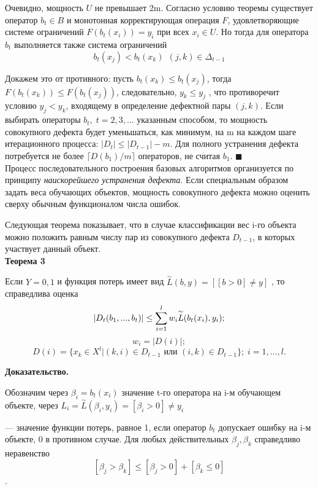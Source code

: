 Очевидно, мощность $U$ не превышает 2m. Согласно условию теоремы существует оператор $b_t \in B$ и монотонная корректирующая операция $F$, удовлетворяющие системе
ограничений $F(b_t(x_i)) = y_i$ при всех $x_i \in U$. Но тогда для оператора $b_t$ выполняется
также система ограничений
\[ b_t(x_j) < b_t(x_k) \; \, (j, k) \in \Delta_{t-1}\]


Докажем это от противного: пусть $b_t(x_k) \leq b_t(x_j )$, тогда $F(b_t(x_k)) \leq F(b_t(x_j ))$, следовательно, $y_k \leq y_j$
, что противоречит условию $y_j < y_k$, входящему в определение
дефектной пары $(j, k)$.
Если выбирать операторы $b_t , \; t = 2, 3, . . .$ указанным способом, то мощность
совокупного дефекта будет уменьшаться, как минимум, на m на каждом шаге итерационного процесса: $\vert D_t \vert \leq \vert D_{t-1}\vert -m$. Для полного устранения дефекта потребуется не более $\lceil D(b_1)/m\rceil$
операторов, не считая $b_1$. $\blacksquare$
\\

Процесс последовательного построения базовых алгоритмов организуется
по принципу \textit{наискорейшего устранения дефекта}.
Если специальным образом задать веса
обучающих объектов, мощность совокупного дефекта можно оценить сверху
обычным функционалом числа ошибок.

Следующая теорема показывает, что в случае классификации вес i-го объекта
можно положить равным числу пар из совокупного дефекта $D_{t-1}$, в которых участвует данный объект.\\

\textbf{Теорема 3} 

Если $Y = {0, 1}$ и функция потерь имеет вид $\overset{\sim}{L}(b, y) =[[b > 0]\neq y]$ , то справедлива оценка \[\vert D_t(b_1, . . . , b_t)\vert \leq \operatornamewithlimits{\sum}^l_{i=1} w_i \overset{\sim}{L} (b_t(x_i), y_i); \]
\[w_i = \vert D(i)\vert ;\]
\[D(i) = \lbrace x_k \in X^l \vert (k, i) \in D_{t-1} \text{ или } (i, k) \in D_{t-1} \rbrace; \; i = 1, . . . , l.\]

\textbf{Доказательство.}

Обозначим через $\beta_i = b_t(x_i)$ значение t-го оператора на i-м обучающем объекте, через $L_i = \overset{\sim}{L}(\beta_i, y_i) = [\beta_i > 0] \neq y_i$

— значение функции потерь, равное 1, если
оператор $b_t$ допускает ошибку на i-м объекте, 0 в противном случае.
Для любых действительных $\beta_j, \beta_k$ справедливо неравенство
\[[\beta_j > \beta_k] \leq [\beta_j > 0] + [\beta_k \leq 0]\].



